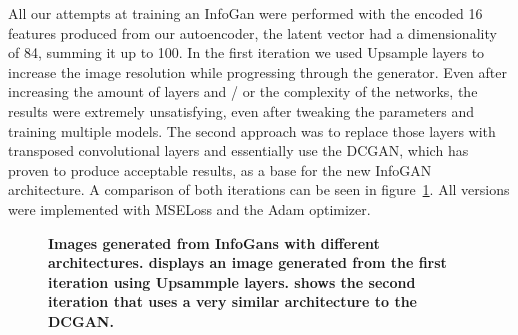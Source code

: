         All our attempts at training an InfoGan were performed with the encoded 16 features produced from our autoencoder, the latent vector had a dimensionality of 84, summing it up to 100. In the first iteration we used Upsample layers to increase the image resolution while progressing through the generator. Even after increasing the amount of layers and / or the complexity of the networks, the results were extremely unsatisfying, even after tweaking the parameters and training multiple models. The second approach was to replace those layers with transposed convolutional layers and essentially use the DCGAN, which has proven to produce acceptable results, as a base for the new InfoGAN architecture. A comparison of both iterations can be seen in figure~\ref{fig:infogan_res_1}. All versions were implemented with MSELoss and the Adam optimizer.

        \begin{figure}[h]
            \centering
            \caption[Images generated from InfoGans with different architectures.]
            {
                \textbf{Images generated from InfoGans with different architectures.  displays an image generated from the first iteration using Upsammple layers.  shows the second iteration that uses a very similar architecture to the DCGAN.}
            }
            \label{fig:infogan_res_1}
        \end{figure}

